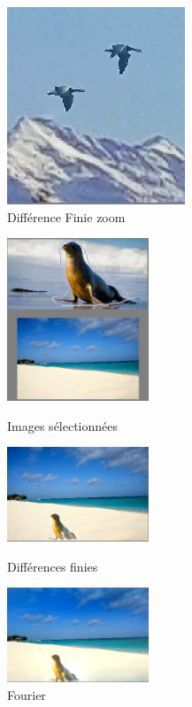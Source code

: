 \begin{figure}[!h]
\centering
\includegraphics[scale=0.5]{Images/Resultats/zoomOiseauDF.png}
\caption{Différence Finie zoom}
\end{figure}

\begin{figure}[!htb]
   \begin{minipage}{0.33\textwidth}
     \centering
     \includegraphics[width = 120pt]{Images/Resultats/otariePlage.png}
     \caption{Images sélectionnées}
      \end{minipage}\hfill
   \begin{minipage}{0.33\textwidth}
     \centering
     \includegraphics[width = 120pt]{Images/Resultats/OtariePlageD.png}
     \caption{Différences finies}
      \end{minipage}\hfill
   \begin{minipage}{0.33\textwidth}
     \centering
     \includegraphics[width= 120pt]{Images/Resultats/OtariePlageF.png}
     \caption{Fourier}
   \end{minipage}
\end{figure}

